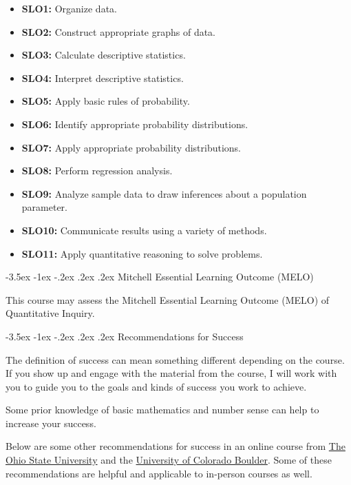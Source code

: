\documentclass{article}
\makeatletter
\renewcommand\section{\@startsection{section}{1}{0pt}%
  {-3.5ex \@plus -1ex \@minus -.2ex}%
  {.2ex \@plus.2ex}%
  {\normalfont\Large\bfseries}} %
\makeatother
\begin{document}
\begin{itemize}
\item \textbf{SLO1:} Organize data.
\item \textbf{SLO2:} Construct appropriate graphs of data.
\item \textbf{SLO3:} Calculate descriptive statistics.
\item \textbf{SLO4:} Interpret descriptive statistics.
\item \textbf{SLO5:} Apply basic rules of probability.
\item \textbf{SLO6:} Identify appropriate probability distributions.
\item \textbf{SLO7:} Apply appropriate probability distributions.
\item \textbf{SLO8:} Perform regression analysis.
\item \textbf{SLO9:} Analyze sample data to draw inferences about a population parameter.
\item \textbf{SLO10:} Communicate results using a variety of methods.
\item \textbf{SLO11:} Apply quantitative reasoning to solve problems.
\end{itemize}

\section{Mitchell Essential Learning Outcome (MELO)}

This course may assess the Mitchell Essential Learning Outcome (MELO) of Quantitative Inquiry.

\section{Recommendations for Success}\label{recommendations-for-success}

The definition of success can mean something different depending on the course. If you show up and engage with the material from the course, I will work with you to guide you to the goals and kinds of success you work to achieve.

Some prior knowledge of basic mathematics and number sense can help to increase your success.

Below are some other recommendations for success in an online course from \href{https://online.osu.edu/resources/learn/5-online-learning-tips-student-success}{The Ohio State University} and the \href{https://www.colorado.edu/health/tips-succeeding-online-classes}{University of Colorado Boulder}. Some of these recommendations are helpful and applicable to in-person courses as well.
\end{document}
